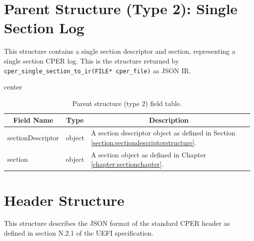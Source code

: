 \documentclass{report}
\newcommand*{\thead}[1]{\multicolumn{1}{|c|}{\bfseries #1}}
\newcommand*{\jsontable}[1]{
    \begin{table}[!ht]
    \label{#1}
    \centering
    \begin{adjustbox}{center}
    \begin{tabular}{|l|c|p{8cm}|}
    \hline
    \thead{Field Name} & \thead{Type} & \thead{Description} \\
    \hline
}
\newcommand*{\jsontableend}[1]{
    \hline
    \end{tabular}
    \end{adjustbox}
    \caption{#1}
    \label{table:#1}
    \end{table}
    \FloatBarrier
}
\begin{document}
\section{Parent Structure (Type 2): Single Section Log}
\label{section:parentstructuretype2}
This structure contains a single section descriptor and section, representing a single section CPER log.
This is the structure returned by \texttt{cper\_single\_section\_to\_ir(FILE* cper\_file)} as JSON IR.

\jsontable{table:parentstructuretype2}
sectionDescriptor & object & A section descriptor object as defined in Section \ref{section:sectiondescriptorstructure}. \\
\hline
section & object & A section object as defined in Chapter \ref{chapter:sectionchapter}.\\
\jsontableend{Parent structure (type 2) field table.}

\section{Header Structure}
\label{section:headerstructure}
This structure describes the JSON format of the standard CPER header as defined in section N.2.1 of the
UEFI specification.
\end{document}
